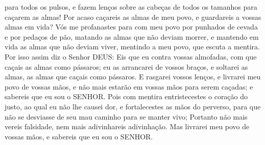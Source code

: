 { para todos os pulsos, e fazem lenços sobre as cabeças de todos os tamanhos para caçarem as almas! Por acaso caçareis as almas de meu povo, e guardareis a vossas
{} almas em vida?
Vós me profanastes para com meu povo por punhados de cevada e por pedaços de pão, matando as almas que não deviam morrer, e mantendo em vida as almas que não deviam viver, mentindo a meu povo, que escuta a mentira.
Por isso assim diz o Senhor DEUS: Eis que eu contra vossas almofadas, com que caçais as almas como
{} pássaros; eu as arrancarei de vossos braços, e soltarei as almas, as almas que caçais como pássaros.
E rasgarei vossos lenços, e livrarei meu povo de vossas mãos, e não mais estarão em vossas mãos para serem caçadas; e sabereis que eu sou o SENHOR.
Pois com mentira entristecestes o coração do justo, ao qual eu não lhe causei dor, e fortalecestes as mãos do perverso, para que não se desviasse de seu mau caminho para se manter vivo;
Portanto não mais vereis falsidade, nem mais adivinhareis adivinhação. Mas livrarei meu povo de vossas mãos, e sabereis que eu sou o SENHOR.

}
